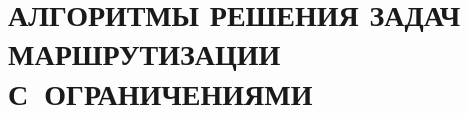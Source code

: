 
\chapter{
  АЛГОРИТМЫ РЕШЕНИЯ ЗАДАЧ МАРШРУТИЗАЦИИ С~ОГРАНИЧЕНИЯМИ
}
\setcounter{chapter}{5}
\setcounter{equation}{0}







